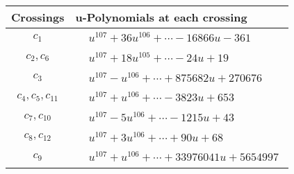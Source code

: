 \documentclass[1p]{elsarticle_modified}
\theoremstyle{definition}
\begin{document}
\begin{tabular}{m{50pt}|m{274pt}}
Crossings & \hspace{64pt}u-Polynomials at each crossing \\
\hline $$\begin{aligned}c_{1}\end{aligned}$$&$\begin{aligned}
&u^{107}+36 u^{106}+\cdots-16866 u-361
\end{aligned}$\\
\hline $$\begin{aligned}c_{2},c_{6}\end{aligned}$$&$\begin{aligned}
&u^{107}+18 u^{105}+\cdots-24 u+19
\end{aligned}$\\
\hline $$\begin{aligned}c_{3}\end{aligned}$$&$\begin{aligned}
&u^{107}- u^{106}+\cdots+875682 u+270676
\end{aligned}$\\
\hline $$\begin{aligned}c_{4},c_{5},c_{11}\end{aligned}$$&$\begin{aligned}
&u^{107}+u^{106}+\cdots-3823 u+653
\end{aligned}$\\
\hline $$\begin{aligned}c_{7},c_{10}\end{aligned}$$&$\begin{aligned}
&u^{107}-5 u^{106}+\cdots-1215 u+43
\end{aligned}$\\
\hline $$\begin{aligned}c_{8},c_{12}\end{aligned}$$&$\begin{aligned}
&u^{107}+3 u^{106}+\cdots+90 u+68
\end{aligned}$\\
\hline $$\begin{aligned}c_{9}\end{aligned}$$&$\begin{aligned}
&u^{107}+u^{106}+\cdots+33976041 u+5654997
\end{aligned}$\\
\hline
\end{tabular}\\~\\
\end{document}
